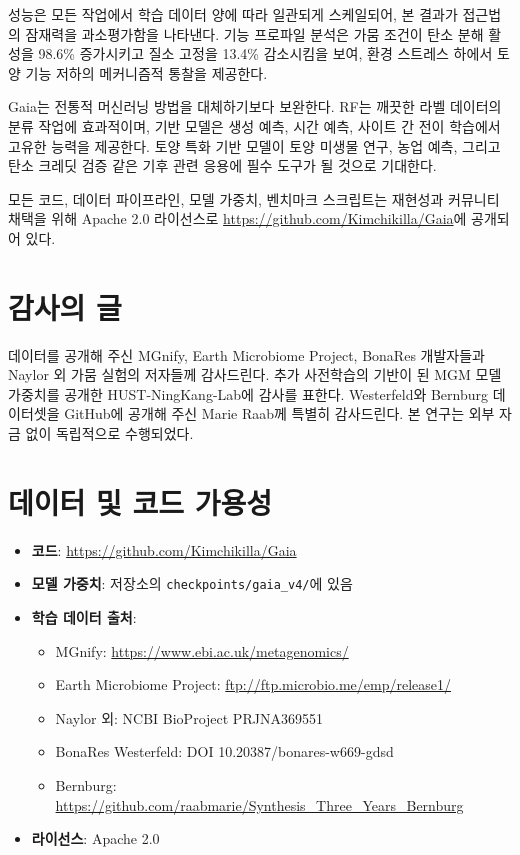 \documentclass[11pt,a4paper]{article}
\begin{document}
성능은 모든 작업에서 학습 데이터 양에 따라 일관되게 스케일되어, 본 결과가 접근법의 잠재력을 과소평가함을 나타낸다. 기능 프로파일 분석은 가뭄 조건이 탄소 분해 활성을 98.6\% 증가시키고 질소 고정을 13.4\% 감소시킴을 보여, 환경 스트레스 하에서 토양 기능 저하의 메커니즘적 통찰을 제공한다.

Gaia는 전통적 머신러닝 방법을 대체하기보다 보완한다. RF는 깨끗한 라벨 데이터의 분류 작업에 효과적이며, 기반 모델은 생성 예측, 시간 예측, 사이트 간 전이 학습에서 고유한 능력을 제공한다. 토양 특화 기반 모델이 토양 미생물 연구, 농업 예측, 그리고 탄소 크레딧 검증 같은 기후 관련 응용에 필수 도구가 될 것으로 기대한다.

모든 코드, 데이터 파이프라인, 모델 가중치, 벤치마크 스크립트는 재현성과 커뮤니티 채택을 위해 Apache 2.0 라이선스로 \url{https://github.com/Kimchikilla/Gaia}에 공개되어 있다.

\section*{감사의 글}

데이터를 공개해 주신 MGnify, Earth Microbiome Project, BonaRes 개발자들과 Naylor 외 가뭄 실험의 저자들께 감사드린다. 추가 사전학습의 기반이 된 MGM 모델 가중치를 공개한 HUST-NingKang-Lab에 감사를 표한다. Westerfeld와 Bernburg 데이터셋을 GitHub에 공개해 주신 Marie Raab께 특별히 감사드린다. 본 연구는 외부 자금 없이 독립적으로 수행되었다.

\section*{데이터 및 코드 가용성}

\begin{itemize}[leftmargin=1.5em]
    \item \textbf{코드}: \url{https://github.com/Kimchikilla/Gaia}
    \item \textbf{모델 가중치}: 저장소의 \texttt{checkpoints/gaia\_v4/}에 있음
    \item \textbf{학습 데이터 출처}:
    \begin{itemize}
        \item MGnify: \url{https://www.ebi.ac.uk/metagenomics/}
        \item Earth Microbiome Project: \url{ftp://ftp.microbio.me/emp/release1/}
        \item Naylor 외: NCBI BioProject PRJNA369551
        \item BonaRes Westerfeld: DOI 10.20387/bonares-w669-gdsd
        \item Bernburg: \url{https://github.com/raabmarie/Synthesis_Three_Years_Bernburg}
    \end{itemize}
    \item \textbf{라이선스}: Apache 2.0
\end{itemize}
\end{document}
